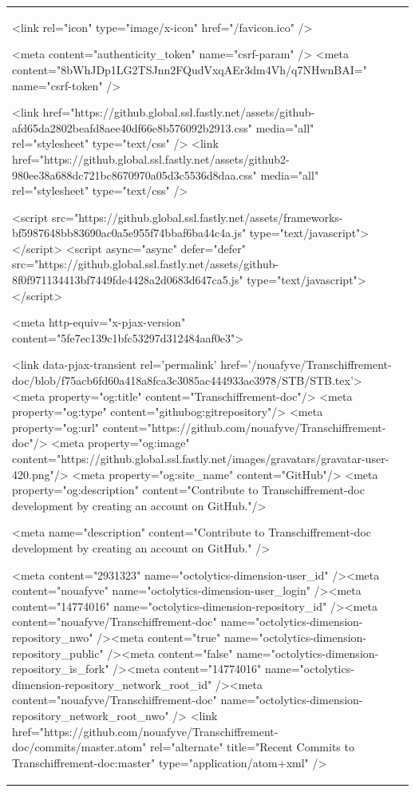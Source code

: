 \documentclass[a4paper,11pt,french]{article}
\begin{document}
\begin{tabular}{|m{8cm}|m{8cm}|}
    
    
    <link rel="icon" type="image/x-icon" href="/favicon.ico" />

    <meta content="authenticity_token" name="csrf-param" />
<meta content="8bWhJDp1LG2TSJnn2FQudVxqAEr3dm4Vh/q7NHwnBAI=" name="csrf-token" />

    <link href="https://github.global.ssl.fastly.net/assets/github-afd65da2802beafd8aee40df66e8b576092b2913.css" media="all" rel="stylesheet" type="text/css" />
    <link href="https://github.global.ssl.fastly.net/assets/github2-980ee38a688dc721bc8670970a05d3c5536d8daa.css" media="all" rel="stylesheet" type="text/css" />
    


      <script src="https://github.global.ssl.fastly.net/assets/frameworks-bf5987648bb83690ac0a5e955f74bbaf6ba44c4a.js" type="text/javascript"></script>
      <script async="async" defer="defer" src="https://github.global.ssl.fastly.net/assets/github-8f0f971134413bf7449fde4428a2d0683d647ca5.js" type="text/javascript"></script>
      
      <meta http-equiv="x-pjax-version" content="5fe7ec139c1bfc53297d312484aaf0e3">

        <link data-pjax-transient rel='permalink' href='/nouafyve/Transchiffrement-doc/blob/f75acb6fd60a418a8fca3c3085ac444933ae3978/STB/STB.tex'>
  <meta property="og:title" content="Transchiffrement-doc"/>
  <meta property="og:type" content="githubog:gitrepository"/>
  <meta property="og:url" content="https://github.com/nouafyve/Transchiffrement-doc"/>
  <meta property="og:image" content="https://github.global.ssl.fastly.net/images/gravatars/gravatar-user-420.png"/>
  <meta property="og:site_name" content="GitHub"/>
  <meta property="og:description" content="Contribute to Transchiffrement-doc development by creating an account on GitHub."/>

  <meta name="description" content="Contribute to Transchiffrement-doc development by creating an account on GitHub." />

  <meta content="2931323" name="octolytics-dimension-user_id" /><meta content="nouafyve" name="octolytics-dimension-user_login" /><meta content="14774016" name="octolytics-dimension-repository_id" /><meta content="nouafyve/Transchiffrement-doc" name="octolytics-dimension-repository_nwo" /><meta content="true" name="octolytics-dimension-repository_public" /><meta content="false" name="octolytics-dimension-repository_is_fork" /><meta content="14774016" name="octolytics-dimension-repository_network_root_id" /><meta content="nouafyve/Transchiffrement-doc" name="octolytics-dimension-repository_network_root_nwo" />
  <link href="https://github.com/nouafyve/Transchiffrement-doc/commits/master.atom" rel="alternate" title="Recent Commits to Transchiffrement-doc:master" type="application/atom+xml" />


\end{tabular}
\end{document}
